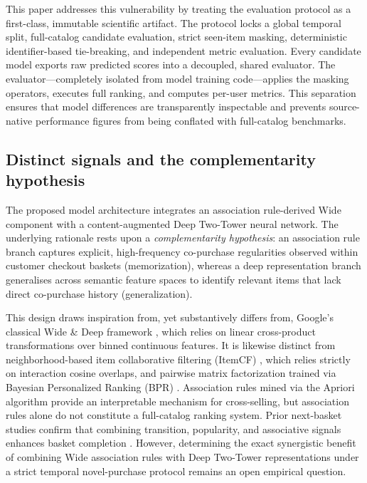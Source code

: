 \documentclass[10pt,a4paper]{article}
\begin{document}
This paper addresses this vulnerability by treating the evaluation protocol as a first-class, immutable scientific artifact. The protocol locks a global temporal split, full-catalog candidate evaluation, strict seen-item masking, deterministic identifier-based tie-breaking, and independent metric evaluation. Every candidate model exports raw predicted scores into a decoupled, shared evaluator. The evaluator—completely isolated from model training code—applies the masking operators, executes full ranking, and computes per-user metrics. This separation ensures that model differences are transparently inspectable and prevents source-native performance figures from being conflated with full-catalog benchmarks.

\subsection{Distinct signals and the complementarity hypothesis}

The proposed model architecture integrates an association rule-derived Wide component with a content-augmented Deep Two-Tower neural network. The underlying rationale rests upon a \textit{complementarity hypothesis}: an association rule branch captures explicit, high-frequency co-purchase regularities observed within customer checkout baskets (memorization), whereas a deep representation branch generalises across semantic feature spaces to identify relevant items that lack direct co-purchase history (generalization). 

This design draws inspiration from, yet substantively differs from, Google's classical Wide \& Deep framework \cite{cheng2016_wide_deep}, which relies on linear cross-product transformations over binned continuous features. It is likewise distinct from neighborhood-based item collaborative filtering (ItemCF) \cite{sarwar2001_itemcf}, which relies strictly on interaction cosine overlaps, and pairwise matrix factorization trained via Bayesian Personalized Ranking (BPR) \cite{rendle2009_bpr}. Association rules mined via the Apriori algorithm \cite{agrawal1994_apriori, ghoshal2014_multi_item_rules} provide an interpretable mechanism for cross-selling, but association rules alone do not constitute a full-catalog ranking system. Prior next-basket studies confirm that combining transition, popularity, and associative signals enhances basket completion \cite{liu2009_hybrid_seq_cf, peng2022_ham, peng2023_m2}. However, determining the exact synergistic benefit of combining Wide association rules with Deep Two-Tower representations under a strict temporal novel-purchase protocol remains an open empirical question.
\end{document}
